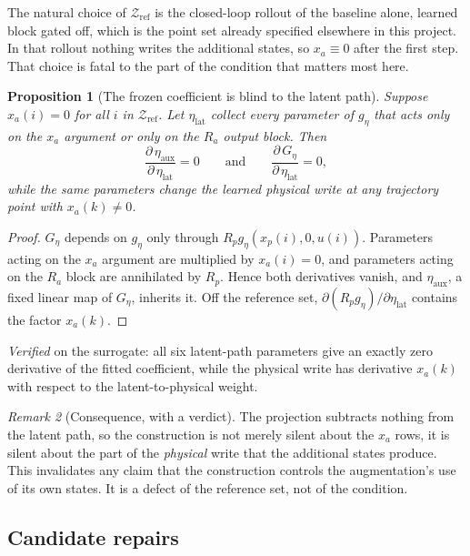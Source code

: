 \documentclass[11pt,a4paper]{article}
\newtheorem{proposition}{Proposition}[section]
\theoremstyle{remark}
\newtheorem{remark}[proposition]{Remark}
\begin{document}
The natural choice of $\mathcal Z_{\mathrm{ref}}$ is the closed-loop rollout of the baseline
alone, learned block gated off, which is the point set already specified elsewhere in this
project. In that rollout nothing writes the additional states, so $x_a\equiv0$ after the first
step. That choice is fatal to the part of the condition that matters most here.

\begin{proposition}[The frozen coefficient is blind to the latent path]\label{prop:zeroslice}
Suppose $x_a(i)=0$ for all $i$ in $\mathcal Z_{\mathrm{ref}}$. Let $\eta_{\mathrm{lat}}$ collect
every parameter of $g_\eta$ that acts only on the $x_a$ argument or only on the $R_a$ output
block. Then
\begin{equation}
 \frac{\partial\,\eta_{\mathrm{aux}}}{\partial\,\eta_{\mathrm{lat}}}=0
 \qquad\text{and}\qquad
 \frac{\partial\,G_\eta}{\partial\,\eta_{\mathrm{lat}}}=0 ,
\end{equation}
while the same parameters change the learned physical write at any trajectory point with
$x_a(k)\neq0$.
\end{proposition}
\begin{proof}
$G_\eta$ depends on $g_\eta$ only through $R_pg_\eta(x_p(i),0,u(i))$. Parameters acting on the
$x_a$ argument are multiplied by $x_a(i)=0$, and parameters acting on the $R_a$ block are
annihilated by $R_p$. Hence both derivatives vanish, and $\eta_{\mathrm{aux}}$, a fixed linear
map of $G_\eta$, inherits it. Off the reference set, $\partial(R_pg_\eta)/\partial\eta_{\mathrm{lat}}$
contains the factor $x_a(k)$.
\end{proof}

\emph{Verified} on the surrogate: all six latent-path parameters give an exactly zero derivative
of the fitted coefficient, while the physical write has derivative $x_a(k)$ with respect to the
latent-to-physical weight.

\begin{remark}[Consequence, with a verdict]
The projection subtracts nothing from the latent path, so the construction is not merely silent
about the $x_a$ rows, it is silent about the part of the \emph{physical} write that the additional
states produce. This invalidates any claim that the construction controls the augmentation's use
of its own states. It is a defect of the reference set, not of the condition.
\end{remark}

\subsection{Candidate repairs}
\end{document}
